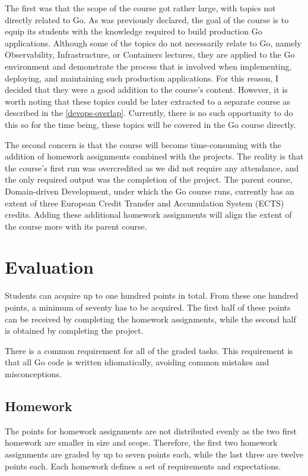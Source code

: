 \documentclass[
  digital,
  color,
  oneside,
  nosansbold,
  nocolorbold,
  lof,
  nolot,
]{fithesis4}
\begin{document}
The first was that the scope of the course got rather large, with topics not directly related to Go. As was previously declared, the goal of the course is to equip its students with the knowledge required to build production Go applications. Although some of the topics do not necessarily relate to Go, namely Observability, Infrastructure, or Containers lectures, they are applied to the Go environment and demonstrate the process that is involved when implementing, deploying, and maintaining such production applications. For this reason, I decided that they were a good addition to the course's content. However, it is worth noting that these topics could be later extracted to a separate course as described in the \cref{devops-overlap}. Currently, there is no such opportunity to do this so for the time being, these topics will be covered in the Go course directly.

The second concern is that the course will become time-consuming with the addition of homework assignments combined with the projects. The reality is that the course's first run was overcredited as we did not require any attendance, and the only required output was the completion of the project. The parent course, Domain-driven Development, under which the Go course runs, currently has an extent of three European Credit Transfer and Accumulation System (ECTS) credits. Adding these additional homework assignments will align the extent of the course more with its parent course.

\section{Evaluation}

Students can acquire up to one hundred points in total. From these one hundred points, a minimum of seventy has to be acquired. The first half of these points can be received by completing the homework assignments, while the second half is obtained by completing the project.

There is a common requirement for all of the graded tasks. This requirement is that all Go code is written idiomatically, avoiding common mistakes and misconceptions.

\subsection{Homework}

The points for homework assignments are not distributed evenly as the two first homework are smaller in size and scope. Therefore, the first two homework assignments are graded by up to seven points each, while the last three are twelve points each. Each homework defines a set of requirements and expectations.
\end{document}
